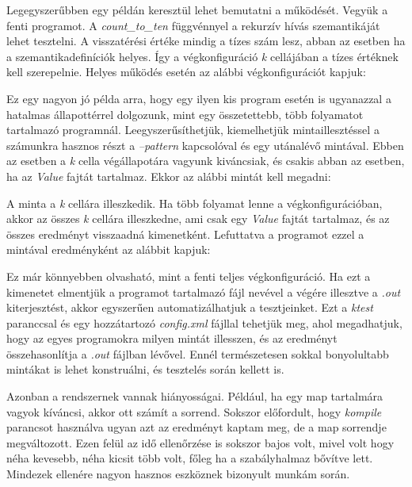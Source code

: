 Legegyszerűbben egy példán keresztül lehet bemutatni a működését. Vegyük a fenti programot. A \textit{count\_to\_ten} függvénnyel a rekurzív hívás szemantikáját lehet tesztelni. A visszatérési értéke mindig a tízes szám lesz, abban az esetben ha a szemantikadefiníciók helyes. Így a végkonfiguráció \textit{k} cellájában a tízes értéknek kell szerepelnie. Helyes működés esetén az alábbi végkonfigurációt kapjuk:



Ez egy nagyon jó példa arra, hogy egy ilyen kis program esetén is ugyanazzal a hatalmas állapottérrel dolgozunk, mint egy összetettebb, több folyamatot tartalmazó programnál. Leegyszerűsíthetjük, kiemelhetjük mintaillesztéssel a számunkra hasznos részt a \textit{--pattern} kapcsolóval és egy utánalévő mintával. Ebben az esetben a \textit{k} cella végállapotára vagyunk kiváncsiak, és csakis abban az esetben, ha az \textit{Value} fajtát tartalmaz. Ekkor az alábbi mintát kell megadni:



A minta a \textit{k} cellára illeszkedik. Ha több folyamat lenne a végkonfigurációban, akkor az összes \textit{k} cellára illeszkedne, ami csak egy \textit{Value} fajtát tartalmaz, és az összes eredményt visszaadná kimenetként. Lefuttatva a programot ezzel a mintával eredményként az alábbit kapjuk:



Ez már könnyebben olvasható, mint a fenti teljes végkonfiguráció. Ha ezt a kimenetet elmentjük a programot tartalmazó fájl nevével a végére illesztve a \textit{.out} kiterjesztést, akkor egyszerűen automatizálhatjuk a tesztjeinket. Ezt a \textit{ktest} paranccsal és egy hozzátartozó \textit{config.xml} fájllal tehetjük meg, ahol megadhatjuk, hogy az egyes programokra milyen mintát illesszen, és az eredményt összehasonlítja a \textit{.out} fájlban lévővel. Ennél természetesen sokkal bonyolultabb mintákat is lehet konstruálni, és tesztelés során kellett is.

Azonban a rendszernek vannak hiányosságai. Például, ha egy map tartalmára vagyok kíváncsi, akkor ott számít a sorrend. Sokszor előfordult, hogy \textit{kompile} parancsot használva ugyan azt az eredményt kaptam meg, de a map sorrendje megváltozott. Ezen felül az idő ellenőrzése is sokszor bajos volt, mivel volt hogy néha kevesebb, néha kicsit több volt, főleg ha a szabályhalmaz bővítve lett. Mindezek ellenére nagyon hasznos eszköznek bizonyult munkám során.

